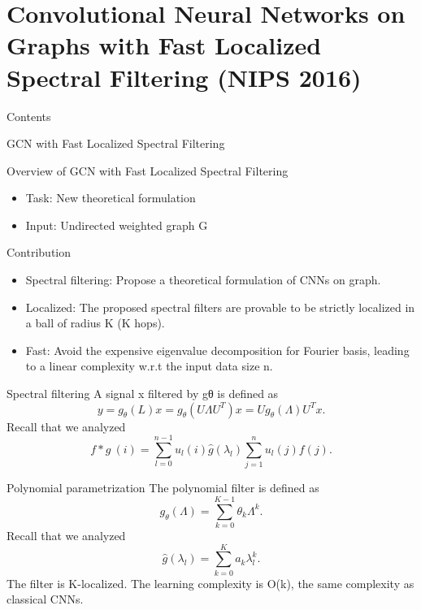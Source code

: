\documentclass{beamer}
\begin{document}
	\section[GCN NIPS 2016]{Convolutional Neural Networks on Graphs with Fast Localized Spectral Filtering (NIPS 2016)}
		\begin{frame}{Contents}
			\small
		\end{frame}
		\begin{frame}{GCN with Fast Localized Spectral Filtering}
			\begin{block}{Overview of GCN with Fast Localized Spectral Filtering}
				\begin{itemize}
					\item Task: New theoretical formulation
					\item Input: Undirected weighted graph G
				\end{itemize}
		\end{block}
		\begin{block}{Contribution}
			\begin{itemize}
				\item Spectral filtering: Propose a theoretical formulation of CNNs on graph.
				\item Localized: The proposed spectral filters are provable to be strictly localized in a ball of radius K (K hops).
				\item Fast: Avoid the expensive eigenvalue decomposition for Fourier basis, leading to a linear complexity w.r.t the input data size n.
			\end{itemize}
			\end{block}
		\end{frame}
	\begin{frame}{Spectral filtering}
		A signal x filtered by gθ is defined as
		\[
		y=g_\theta(L)x = g_\theta(U\Lambda U^T)x = Ug_\theta(\Lambda)U^Tx.
		\]
		Recall that we analyzed
		\[
		f*g\ (i) = \sum_{l=0}^{n-1} u_l(i)\hat{g}(\lambda_l)\sum_{j=1}^{n}u_l(j)f(j).
		\]
	\end{frame}
	\begin{frame}{Polynomial parametrization}
		 The polynomial filter is defined as
		 \[
		 g_\theta(\Lambda) = \sum_{k=0}^{K-1}\theta_k\Lambda^k.
		 \]
		 Recall that we analyzed
		 \[
		 \hat{g}(\lambda_l) = \sum_{k=0}^{K}a_k\lambda_l^k.
		 \]
		 The filter is K-localized. The learning complexity is O(k), the same complexity as classical CNNs.
	\end{frame}
\end{document}
